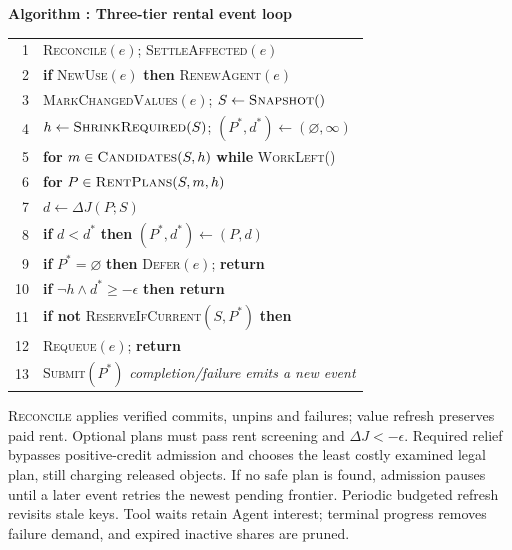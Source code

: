 \par\medskip\noindent\begin{minipage}{\columnwidth}
\raggedright
 \label{alg:placement}
 \textbf{Algorithm \thedesignalgorithm: Three-tier rental event loop}
 \par\smallskip
 \begin{tabularx}{\columnwidth}{@{}r@{\quad}X@{}}
 \toprule
 1 & \textsc{Reconcile}$(e)$; \textsc{SettleAffected}$(e)$ \\
 2 & \textbf{if} \textsc{NewUse}$(e)$ \textbf{then} \textsc{RenewAgent}$(e)$ \\
 3 & \textsc{MarkChangedValues}$(e)$; $S\gets\textsc{Snapshot}()$ \\
 4 & $h\gets\textsc{ShrinkRequired}(S)$; $(P^*,d^*)\gets(\varnothing,\infty)$ \\
 5 & \textbf{for} $m\in\textsc{Candidates}(S,h)$ \textbf{while} \textsc{WorkLeft}() \\
 6 & \quad \textbf{for} $P\in\textsc{RentPlans}(S,m,h)$ \\
 7 & \qquad $d\gets\Delta J(P;S)$ \\
 8 & \qquad \textbf{if} $d<d^*$ \textbf{then} $(P^*,d^*)\gets(P,d)$ \\
 9 & \textbf{if} $P^*=\varnothing$ \textbf{then} \textsc{Defer}$(e)$; \textbf{return} \\
 10 & \textbf{if} $\neg h\land d^*\ge-\epsilon$ \textbf{then return} \\
 11 & \textbf{if not} \textsc{ReserveIfCurrent}$(S,P^*)$ \textbf{then} \\
 12 & \quad \textsc{Requeue}$(e)$; \textbf{return} \\
 13 & \textsc{Submit}$(P^*)$ \quad\textit{completion/failure emits a new event} \\
 \bottomrule
 \end{tabularx}
\end{minipage}\par\medskip

\textsc{Reconcile} applies verified commits, unpins and failures;
value refresh preserves paid rent. Optional
plans must pass rent screening and $\Delta J<-\epsilon$. Required relief
bypasses positive-credit admission and chooses the least costly examined
legal plan, still charging released objects. If no safe plan is found,
admission pauses until a later event retries the newest pending frontier.
Periodic budgeted refresh revisits stale keys. Tool waits retain Agent
interest; terminal progress removes failure demand, and expired inactive
shares are pruned.

